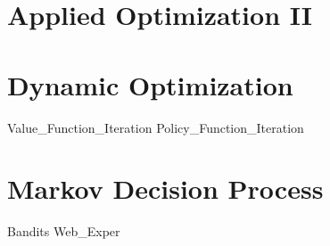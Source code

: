 \documentclass[nociteref]{newsiambook}
\begin{document}
\part{Applied Optimization II}

\part{Dynamic Optimization}
{Value_Function_Iteration}
{Policy_Function_Iteration}

\part{Markov Decision Process}
{Bandits}
{Web_Exper}
\end{document}
